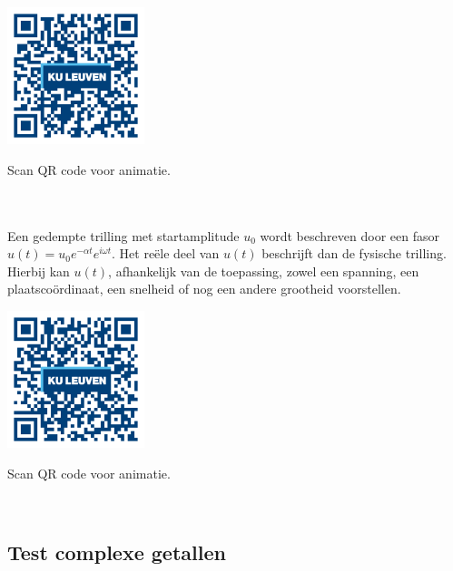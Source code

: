\begin{minipage}{.25\linewidth}
	\raggedright
	\includegraphics[width=4cm]{3_gonio_complexe_getallen/inputs/QR_Code_ANIMATIE6_module3new}
\end{minipage}
\begin{minipage}{.7\linewidth}
	Scan QR code voor animatie.
\end{minipage}    \\     \\

Een gedempte trilling met startamplitude $u_{0}$ wordt beschreven door een fasor $u(t)=u_{0}e^{-\alpha t}e^{i\omega t}$. Het re\"{e}le deel van $u(t)$ beschrijft dan de fysische trilling. Hierbij kan $u(t)$, afhankelijk van de toepassing, zowel een spanning, een plaatsco\"{o}rdinaat, een snelheid of nog een andere grootheid voorstellen.\\

\begin{minipage}{.25\linewidth}
	\raggedright
	\includegraphics[width=4cm]{3_gonio_complexe_getallen/inputs/QR_Code_ANIMATIE7_module3new}
\end{minipage}
\begin{minipage}{.7\linewidth}
	Scan QR code voor animatie.
\end{minipage}   \\

\subsection{Test complexe getallen}
